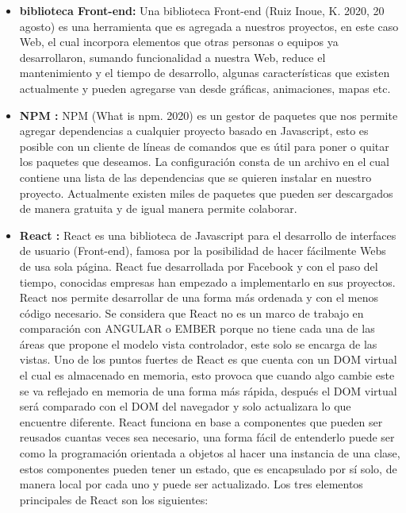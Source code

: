     \begin{itemize}
    
    	\item \textbf{biblioteca Front-end:} Una biblioteca Front-end \cite{frontEnd2} (Ruiz Inoue, K. 2020, 20 agosto) es una herramienta que es agregada a nuestros proyectos, en este caso Web, el cual incorpora elementos que otras personas o equipos ya desarrollaron, sumando funcionalidad a nuestra Web, reduce el mantenimiento y el tiempo de desarrollo, algunas características que existen actualmente y pueden agregarse van desde gráficas, animaciones, mapas etc. 
      
       \item \textbf{NPM :} NPM \cite{npm} (What is npm. 2020) es un gestor de paquetes que nos permite agregar dependencias a cualquier proyecto basado en Javascript, esto es posible con un cliente de líneas de comandos que es útil para poner o quitar los paquetes que deseamos. La configuración consta de un archivo en el cual contiene una lista de las dependencias que se quieren instalar en nuestro proyecto. Actualmente existen miles de paquetes que pueden ser descargados de manera gratuita y de igual manera permite colaborar. 
       
       \item \textbf{ React :} React \cite{react} es una biblioteca de Javascript para el desarrollo de interfaces de usuario (Front-end), famosa por la posibilidad de hacer fácilmente Webs de usa sola página. React fue desarrollada por Facebook y con el paso del tiempo, conocidas empresas han empezado a implementarlo en sus proyectos. 
    React nos permite desarrollar de una forma más ordenada y con el menos código necesario. 
    Se considera que React no es un marco de trabajo en comparación con ANGULAR o EMBER porque no tiene cada una de las áreas que propone el modelo vista controlador, este solo se encarga de las vistas. 
    Uno de los puntos fuertes de React es que cuenta con un DOM virtual el cual es almacenado en memoria, esto provoca que cuando algo cambie este se va reflejado en memoria de una forma más rápida, después el DOM virtual será comparado con el DOM del navegador y solo actualizara lo que encuentre diferente. 
    React funciona en base a componentes que pueden ser reusados cuantas veces sea necesario, una forma fácil de entenderlo puede ser como la programación orientada a objetos al hacer una instancia de una clase, estos componentes pueden tener un estado, que es encapsulado por sí solo, de manera local por cada uno y puede ser actualizado.
    Los tres elementos principales de React son los siguientes:
 \begin{itemize}
 

\end{itemize}
\end{itemize}
